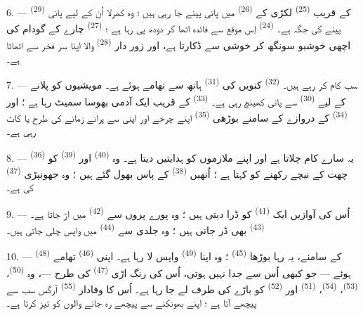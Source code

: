 6. ---  \textsuperscript{(29)} کے قریب 
\textsuperscript{(25)} لکڑی کے  \textsuperscript{(26)} میں
پانی پینے جا رہی ہیں ؛ وہ کھرلا اُن کے لیے پانی پینے کی جگہ ہے۔
 \textsuperscript{(24)} اِس موقع سے فائدہ اٹھا کر دودھ
پی رہا ہے ؛  \textsuperscript{(27)} چارے کے گودام کی اچھی
خوشبو سونگھ کر خوشی سے ڈکارتا ہے، اور زور دار 
\textsuperscript{(28)} والا اپنا سر فخر سے اٹھاتا ہے۔

7. --- سب کام کر رہے ہیں۔  \textsuperscript{(32)}
کنویں کی  \textsuperscript{(31)} ہاتھ سے تھامے ہوئے ہے۔
مویشیوں کو پلانے کے لیے  \textsuperscript{(30)} سے پانی
کھینچ رہی ہے۔  \textsuperscript{(33)} کے قریب
ایک آدمی بھوسا سمیٹ رہا ہے ؛ اور  \textsuperscript{(34)}
کے دروازے کے سامنے بوڑھی 
\textsuperscript{(35)} اپنے چرخے اور اپنی  سے پرانے
زمانے کی طرح  یا  کات رہی ہے۔

\VUsaut{3.0mm}
\VUsaut{3.0mm}

8. ---  \textsuperscript{(36)} یہ سارے کام چلاتا ہے
اور اپنے ملازموں کو ہدایتیں دیتا ہے۔ وہ 
\textsuperscript{(40)} اور  \textsuperscript{(39)} کو چھت
کے نیچے رکھنے کو کہتا ہے ؛ اُنھیں 
\textsuperscript{(38)} کے پاس بھول گئے ہیں ؛ وہ جھونپڑی 
\textsuperscript{(37)} کی ہے۔

9. --- اُس کی آوازیں ایک  \textsuperscript{(41)} کو ڈرا
دیتی ہیں ؛ وہ پورے پروں سے  \textsuperscript{(42)}
میں اڑ جاتا ہے۔  \textsuperscript{(43)} بھی ڈر جاتی
ہیں ؛ وہ جلدی سے  \textsuperscript{(44)} میں واپس
چلی جاتی ہیں۔

10. ---  \textsuperscript{(48)} کے سامنے، یہ رہا
بوڑھا  \textsuperscript{(45)} ؛ وہ اپنا 
\textsuperscript{(49)} واپس لا رہا ہے۔ اپنی 
\textsuperscript{(46)} تھامے ہوئے — جو کبھی اُس سے جدا نہیں ہوتی،
اُس کی رنگ اڑی  \textsuperscript{(47)} کی طرح —، وہ
 \textsuperscript{(50)}، 
\textsuperscript{(53)}،  \textsuperscript{(54)}،
 \textsuperscript{(51)} اور 
\textsuperscript{(52)} کو باڑے کی طرف لے جا رہا ہے۔ اُس کا وفادار
 \textsuperscript{(55)} آرگس سب سے پیچھے آتا ہے ؛ اپنے
بھونکنے سے پیچھے رہ جانے والوں کو تیز کرتا ہے۔

